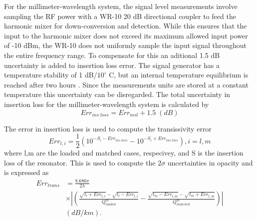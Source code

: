 For the millimeter-wavelength system, the signal level measurements involve sampling the RF power with a WR-10 20 dB directional coupler to feed the harmonic mixer for down-conversion and detection. While this ensures that the input to the harmonic mixer does not exceed its maximum allowed input power of -10 dBm, the WR-10 does not uniformly sample the input signal throughout the entire frequency range. To compensate for this an aditional 1.5 dB uncertainty is added to insertion loss error. The signal generator has a temperature stability of 1 dB/$10^\circ$ C, but an internal temperature equilibrium is reached after two hours \cite{Hewlett-Packard}. Since the measurements units are stored at a constant temperature this uncertainty can be disregarded. The total uncertainty in insertion loss for the millimeter-wavelength system is calculated by
\begin{equation}
Err_{ins\;loss} = Err_{msl} +1.5\;(dB)
\end{equation}

The error in insertion loss is used to compute the transissivity error
\begin{equation}
Err_{t,i} = \frac{1}{2} ( 10^{-S_i - Err_{ins\;loss}} - 10^{-S_i + Err_{ins\;loss}}) , i=l,m
\end{equation}
where l,m are the loaded and matched cases, respecivey, and S is the insertion loss of the resonator. This is used to compute the $2\sigma$ uncertainties in opacity and is expressed as
\begin{equation}
\begin{split}
Err_{trans} &= \frac{8.686 \pi}{2\lambda}\\ 
 &\times \left| \left( \frac{\sqrt{t_l + Err_{t,l}}- \sqrt{t_l - Err_{t,l}}}{Q^m_{loaded}} - \frac{\sqrt{t_m - Err_{t,m}}- \sqrt{t_m + Err_{t,m}}}{Q^m_{matched}} \right) \right|\\
 &(dB/km).
\end{split}
\end{equation}

